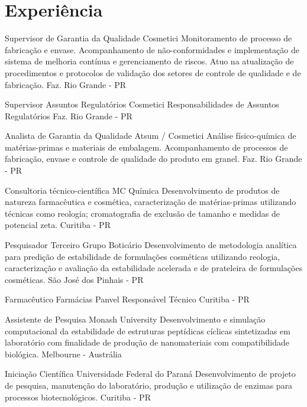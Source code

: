\section{Experiência}


{Supervisor de Garantia da Qualidade}
{Cosmetici}
{
Monitoramento de processo de fabricação e envase.
Acompanhamento de não-conformidades e implementação de
sistema de melhoria contínua e gerenciamento de riscos.
Atuo na atualização de procedimentos e protocolos de validação dos setores
de controle de qualidade e de fabricação.
}
{Faz. Rio Grande - PR}

{Supervisor Assuntos Regulatórios}
{Cosmetici}
{
Responsabilidades de Assuntos Regulatórios
}
{Faz. Rio Grande - PR}

{Analista de Garantia da Qualidade}
{Atsum / Cosmetici}
{
Análise físico-química de matérias-primas e materiais de embalagem.
Acompanhamento de processos de fabricação, envase e controle de qualidade do
produto em granel.
}
{Faz. Rio Grande - PR}

{Consultoria técnico-científica}
{MC Química}
{
Desenvolvimento de produtos de natureza farmacêutica e cosmética, 
caracterização de matérias-primas utilizando técnicas como reologia;
cromatografia de exclusão de tamanho e medidas de potencial zeta.
}
{Curitiba - PR}

{Pesquisador Terceiro}
{Grupo Boticário}
{
Desenvolvimento de metodologia analítica para predição de estabilidade
de formulações cosméticas utilizando reologia,
caracterização e avaliação da estabilidade acelerada e de prateleira
de formulações cosméticas.
}
{São José dos Pinhais - PR}

{Farmacêutico}
{Farmácias Panvel}
{Responsável Técnico}
{Curitiba - PR}

{Assistente de Pesquisa}
{Monash University}
{
Desenvolvimento e simulação computacional da estabilidade 
de estruturas peptídicas cíclicas sintetizadas em laboratório 
com finalidade de produção de nanomateriais com compatibilidade biológica.
}
{Melbourne - Austrália}

{Iniciação Científica}
{Universidade Federal do Paraná}
{
Desenvolvimento de projeto de pesquisa, 
manutenção do laboratório, 
produção e utilização de enzimas para processos biotecnológicos.
}
{Curitiba - PR}